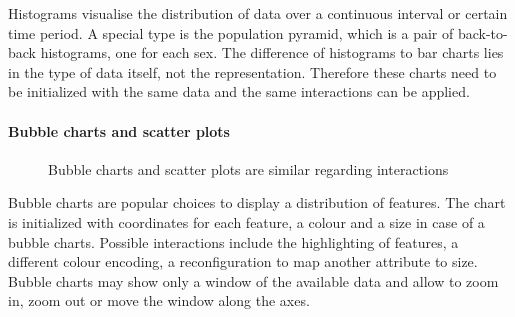 Histograms visualise the distribution of data over a continuous interval or certain time period.
A special type is the population pyramid, which is a pair of back-to-back histograms, one for each sex.
The difference of histograms to bar charts lies in the type of data itself, not the representation.
Therefore these charts need to be initialized with the same data and the same interactions can be applied.


\paragraph{Bubble charts and scatter plots}

\begin{figure}
  \centering
    \qquad
    \caption{Bubble charts and scatter plots are similar regarding interactions}%
    \label{fig:concept:chart-types:bubble-chart}
\end{figure}

Bubble charts are popular choices to display a distribution of features.
The chart is initialized with coordinates for each feature, a colour and a size in case of a bubble charts.
Possible interactions include the highlighting of features, a different colour encoding, a reconfiguration to map another attribute to size.
Bubble charts may show only a window of the available data and allow to zoom in, zoom out or move the window along the axes.



